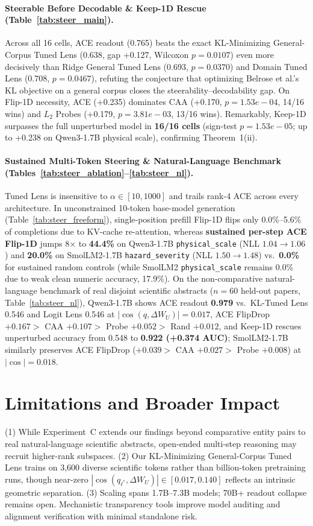 \documentclass[10pt,twocolumn]{article}
\begin{document}
\paragraph{Steerable Before Decodable \& Keep-1D Rescue (Table~\ref{tab:steer_main}).} Across all 16 cells, ACE readout (0.765) beats the exact KL-Minimizing General-Corpus Tuned Lens (0.638, gap +0.127, Wilcoxon $p=0.0107$) even more decisively than Ridge General Tuned Lens (0.693, $p=0.0370$) and Domain Tuned Lens (0.708, $p=0.0467$), refuting the conjecture that optimizing Belrose et al.'s KL objective on a general corpus closes the steerability--decodability gap. On Flip-1D necessity, ACE (+0.235) dominates CAA (+0.170, $p=1.53e-04$, 14/16 wins) and $L_2$ Probes (+0.179, $p=3.81e-03$, 13/16 wins). Remarkably, Keep-1D surpasses the full unperturbed model in \textbf{16/16 cells} (sign-test $p=1.53e-05$; up to +0.238 on Qwen3-1.7B physical scale), confirming Theorem~1(ii).

\paragraph{Sustained Multi-Token Steering \& Natural-Language Benchmark (Tables~\ref{tab:steer_ablation}--\ref{tab:steer_nl}).} Tuned Lens is insensitive to $\alpha \in [10, 1000]$ and trails rank-4 ACE across every architecture. In unconstrained 10-token base-model generation (Table~\ref{tab:steer_freeform}), single-position prefill Flip-1D flips only 0.0\%--5.6\% of completions due to KV-cache re-attention, whereas \textbf{sustained per-step ACE Flip-1D} jumps 8$\times$ to \textbf{44.4\%} on Qwen3-1.7B \texttt{physical\_scale} (NLL $1.04 \to 1.06$) and \textbf{20.0\%} on SmolLM2-1.7B \texttt{hazard\_severity} (NLL $1.50 \to 1.48$) vs.\ \textbf{0.0\%} for sustained random controls (while SmolLM2 \texttt{physical\_scale} remains 0.0\% due to weak clean numeric accuracy, 17.9\%). On the non-comparative natural-language benchmark of real disjoint scientific abstracts ($n=60$ held-out papers, Table~\ref{tab:steer_nl}), Qwen3-1.7B shows ACE readout \textbf{0.979} vs.\ KL-Tuned Lens 0.546 and Logit Lens 0.546 at $|\cos(q,\Delta W_U)|=0.017$, ACE FlipDrop $+0.167 >$ CAA $+0.107 >$ Probe $+0.052 >$ Rand $+0.012$, and Keep-1D rescues unperturbed accuracy from 0.548 to \textbf{0.922 (+0.374 AUC)}; SmolLM2-1.7B similarly preserves ACE FlipDrop ($+0.039 >$ CAA $+0.027 >$ Probe $+0.008$) at $|\cos|=0.018$.

\section{Limitations and Broader Impact}
(1) While Experiment~C extends our findings beyond comparative entity pairs to real natural-language scientific abstracts, open-ended multi-step reasoning may recruit higher-rank subspaces. (2) Our KL-Minimizing General-Corpus Tuned Lens trains on 3,600 diverse scientific tokens rather than billion-token pretraining runs, though near-zero $|\cos(q_{\ell^*}, \Delta W_U)| \in [0.017, 0.140]$ reflects an intrinsic geometric separation. (3) Scaling spans 1.7B--7.3B models; 70B+ readout collapse remains open. Mechanistic transparency tools improve model auditing and alignment verification with minimal standalone risk.



\end{document}
